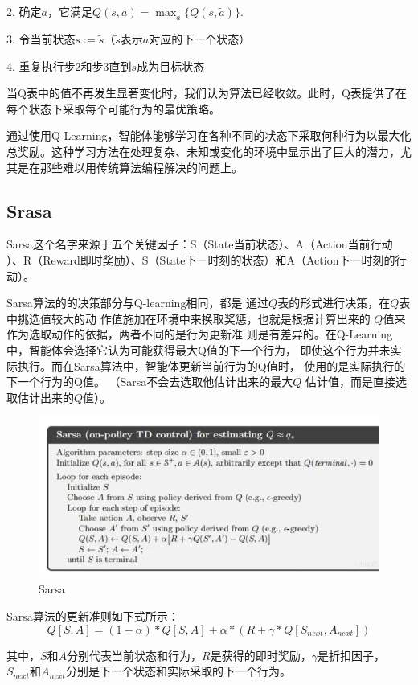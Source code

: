 \documentclass{thuemp}
\begin{document}
2. 确定$a$，它满足$Q(s,a)=\max_{\tilde{a}}\{Q(s,\widetilde{a})\}.$

3. 令当前状态$s:=\widetilde{s}$（$\tilde{s}$表示$a$对应的下一个状态）

4. 重复执行步2和步3直到$s$成为目标状态

当Q表中的值不再发生显著变化时，我们认为算法已经收敛。此时，Q表提供了在每个状态下采取每个可能行为的最优策略。

通过使用Q-Learning，智能体能够学习在各种不同的状态下采取何种行为以最大化总奖励。这种学习方法在处理复杂、未知或变化的环境中显示出了巨大的潜力，尤其是在那些难以用传统算法编程解决的问题上。\\
\vbox{}
\subsection{Srasa}
Sarsa\cite{amazon}这个名字来源于五个关键因子：S（State当前状态）、A（Action当前行动 
）、R（Reward即时奖励）、S（State下一时刻的状态）和A（Action下一时刻的行动）。

Sarsa算法的的决策部分与Q-learning相同，都是
通过$Q$表的形式进行决策，在$Q$表中挑选值较大的动
作值施加在环境中来换取奖惩，也就是根据计算出来的
$Q$值来作为选取动作的依据，两者不同的是行为更新准
则是有差异的。在Q-Learning中，智能体会选择它认为可能获得最大Q值的下一个行为，
即使这个行为并未实际执行。而在Sarsa算法中，智能体更新当前行为的Q值时，
使用的是实际执行的下一个行为的Q值。
（Sarsa不会去选取他估计出来的最大$Q$
估计值，而是直接选取估计出来的$Q$值）。
\begin{figure}[H]
  \centering
  \includegraphics[width=0.8\linewidth]{./img/sarsa.png}
  \caption{Sarsa}
\end{figure}

Sarsa算法的更新准则如下式所示：
$$Q[S,A]=(1-\alpha)*Q[S,A]+\alpha*(R+\gamma*Q[S_{next},A_{next}])$$

其中，$S$和$A$分别代表当前状态和行为，$R$是获得的即时奖励，$\gamma$是折扣因子，
$S_{next}$和$A_{next}$分别是下一个状态和实际采取的下一个行为。
\end{document}
